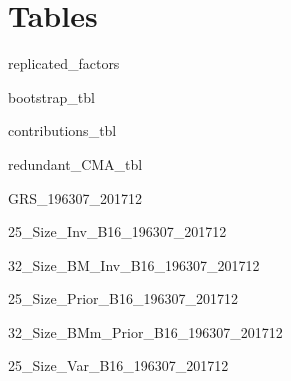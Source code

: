 
\section{Tables} \label{sec:tables}

{replicated_factors}

\begin{landscape}
{bootstrap_tbl}
\end{landscape}

{contributions_tbl}

{redundant_CMA_tbl}

{GRS_196307_201712}

{25_Size_Inv_B16_196307_201712}

\begin{landscape}
{32_Size_BM_Inv_B16_196307_201712}
\end{landscape}

{25_Size_Prior_B16_196307_201712}

\begin{landscape}
{32_Size_BMm_Prior_B16_196307_201712}
\end{landscape}

{25_Size_Var_B16_196307_201712}
